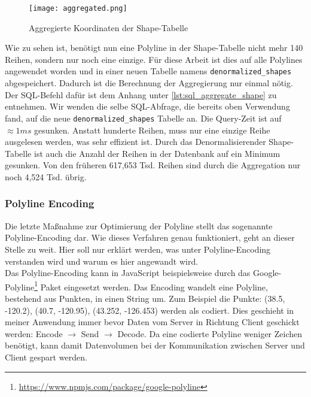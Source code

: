     \begin{figure}[htbp]
      \begin{center}
        \texttt{[image: aggregated.png]}
        \caption{Aggregierte Koordinaten der Shape-Tabelle}
        \label{fig:aggregated}
      \end{center}
    \end{figure}

    Wie zu sehen ist, benötigt nun eine Polyline in der Shape-Tabelle nicht mehr 140 Reihen, sondern nur noch eine einzige. Für diese Arbeit ist dies auf alle Polylines angewendet worden und in einer neuen Tabelle namens \texttt{denormalized\_shapes} abgespeichert. Dadurch ist die Berechnung der Aggregierung nur einmal nötig. Der SQL-Befehl dafür ist dem Anhang unter \ref{lst:sql_aggregate_shape} zu entnehmen.
    Wir wenden die selbe SQL-Abfrage, die bereits oben Verwendung fand, auf die neue \texttt{denormalized\_shapes} Tabelle an. Die Query-Zeit ist auf $\approx1ms$ gesunken. Anstatt hunderte Reihen, muss nur eine einzige Reihe ausgelesen werden, was sehr effizient ist. Durch das Denormalisieren\footnotemark der Shape-Tabelle ist auch die Anzahl der Reihen in der Datenbank auf ein Minimum gesunken. Von den früheren 617,653 Tsd. Reihen sind durch die Aggregation nur noch 4,524 Tsd. übrig.

  

  \subsubsection{Polyline Encoding}
  \label{ssub:polyline_encoding}
    Die letzte Maßnahme zur Optimierung der Polyline stellt das sogenannte Polyline-Encoding dar. Wie dieses Verfahren genau funktioniert, geht an dieser Stelle zu weit. Hier soll nur erklärt werden, was unter Polyline-Encoding verstanden wird und warum es hier angewandt wird.\\

    Das Polyline-Encoding kann in JavaScript beispielsweise durch das Google-Polyline\footnote{\url{https://www.npmjs.com/package/google-polyline}} Paket eingesetzt werden. Das Encoding wandelt eine Polyline, bestehend aus Punkten, in einen String um. Zum Beispiel die Punkte: (38.5, -120.2), (40.7, -120.95), (43.252, -126.453) werden als
    \colorbox{materialGrey}{\texttt{\color{white}{\_p\textasciitilde iF\textasciitilde ps|U\_ulLnnqC\_mqNvxq`@}}}
    codiert. Dies geschieht in meiner Anwendung immer bevor Daten vom Server in Richtung Client geschickt werden: Encode $\rightarrow$ Send $\rightarrow$ Decode. Da eine codierte Polyline weniger Zeichen benötigt, kann damit Datenvolumen bei der Kommunikation zwischen Server und Client gespart werden.

